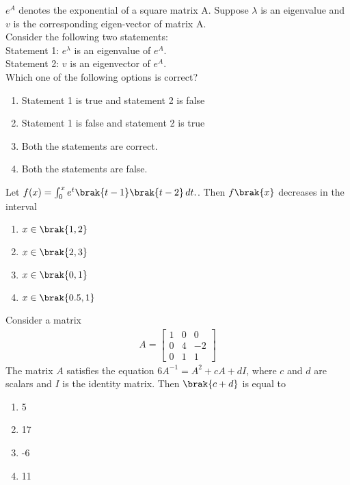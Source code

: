 \iffalse
\chapter{2022}
\author{AI24BTECH11028}
\section{ee}
\fi

    \item $e^A$  denotes the exponential of a square matrix A. Suppose $\lambda$ is an eigenvalue and $v$ is the corresponding eigen-vector of matrix A. \\
    Consider the following two statements:\\
    Statement 1: $e^{\lambda}$ is an eigenvalue of $e^A$.\\
    Statement 2: $v$ is an eigenvector of $e^A$.\\
    Which one of the following options is correct? 
    \begin{enumerate}
        \item Statement 1 is true and statement 2 is false
        \item Statement 1 is false and statement 2 is true
        \item Both the statements are correct. 
        \item Both the statements are false. 
    \end{enumerate}

    \item Let $f(x) = \int_0^x e^t \brak{t - 1}\brak{t - 2} \, dt.$. Then $f\brak{x}$ decreases in the interval
    \begin{enumerate}
        \item $x \in \brak{1,2}$
        \item $x \in \brak{2,3}$
        \item $x \in \brak{0,1}$
        \item $x \in \brak{0.5,1}$
    \end{enumerate}

    \item Consider a matrix
    \begin{align*}
        A = 
            \begin{bmatrix}
            1 & 0 & 0 \\
            0 & 4 & -2 \\
            0 & 1 & 1
            \end{bmatrix}        
    \end{align*}
    The matrix $A$ satisfies the equation $6A^{-1} = A^2 + cA + dI$, where $c$ and $d$ are scalars and $I$ is the identity matrix. Then $\brak{c + d}$ is equal to
    \begin{enumerate}
        \item 5
        \item 17
        \item -6
        \item 11
    \end{enumerate}

